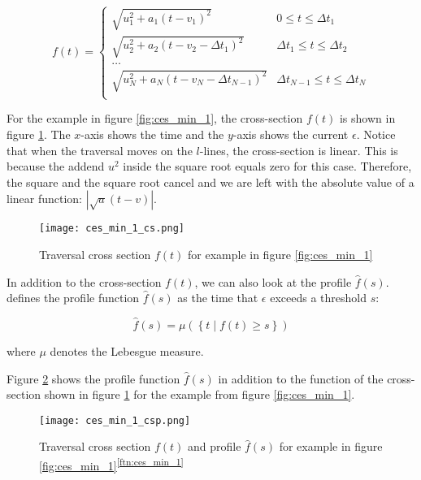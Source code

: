 \[ f(t) =
\begin{cases} 
	\sqrt{u_1^2 + a_1(t - v_1)^2} & 0 \leq t \leq {\Delta t}_1 \\
	\sqrt{u_2^2 + a_2(t - v_2 - {\Delta t}_1)^2} & {\Delta t}_1 \leq t \leq {\Delta t}_2 \\
	\dots \\
	\sqrt{u_N^2 + a_N(t - v_N - {\Delta t}_{N-1})^2} & {\Delta t}_{N-1} \leq t \leq {\Delta t}_N \\
\end{cases}
\]

For the example in figure \ref{fig:ces_min_1}, the cross-section $f(t)$ is shown in figure \ref{fig:ces_min_1_cs}. The $x$-axis shows the time and the $y$-axis shows the current $\epsilon$. Notice that when the traversal moves on the $l$-lines, the cross-section is linear. This is because the addend $u^2$ inside the square root equals zero for this case. Therefore, the square and the square root cancel and we are left with the absolute value of a linear function: $\left| \sqrt{a}(t - v) \right|$.

 \begin{figure}[H]
    \centering
    
    \texttt{[image: ces\_min\_1\_cs.png]}
		
	\caption{Traversal cross section $f(t)$ for example in figure \ref{fig:ces_min_1}\protect\footnotemark}
    \label{fig:ces_min_1_cs}
\end{figure}

In addition to the cross-section $f(t)$, we can also look at the profile $\hat{f}(s)$. \citeauthor{rotelex} defines the profile function $\hat{f}(s)$ as the time that $\epsilon$ exceeds a threshold $s$:

$$\hat{f}(s) = \mu(\left\{ t \mid f(t) \geq s \right\})$$

where $\mu$ denotes the Lebesgue measure.\cite{rotelex}

Figure \ref{fig:ces_min_1_csp} shows the profile function $\hat{f}(s)$ in addition to the function of the cross-section shown in figure \ref{fig:ces_min_1_cs} for the example from figure \ref{fig:ces_min_1}.

 \begin{figure}[H]
    \centering
    
    \texttt{[image: ces\_min\_1\_csp.png]}
		
	\caption{Traversal cross section $f(t)$ and profile $\hat{f}(s)$ for example in figure \ref{fig:ces_min_1}\textsuperscript{\ref{ftn:ces_min_1}}}
    \label{fig:ces_min_1_csp}
\end{figure}

